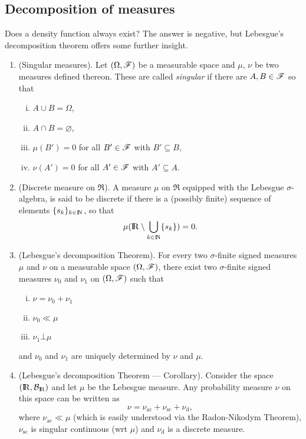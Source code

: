 \documentclass[a4paper,10pt]{article}
\begin{document}
\subsection{Decomposition of measures}
Does a density function always exist? The answer is negative, but Lebesgue's decomposition 
theorem offers some further insight. 
\begin{enumerate}
 \item (Singular measures). Let $(\Omega, \mathscr{F})$ be a measurable space and $\mu$, $\nu$
       be two measures defined thereon. These are called \textit{singular} if there are 
       $A,B\in\mathscr{F}$ so that
       \begin{enumerate}[(i)]
        \item $A\cup B=\Omega$, 
        \item $A\cap B=\varnothing$,
        \item $\mu(B')=0$ for all $B'\in\mathscr{F}$ with $B'\subseteq B$,
        \item $\nu(A')=0$ for all $A'\in\mathscr{F}$ with $A'\subseteq A$.
       \end{enumerate}
 \item (Discrete measure on $\Re$). A measure $\mu$ on $\Re$ equipped with the Lebesgue $\sigma$-algebra,
       is said to be discrete if there is a (possibly finite) sequence of elements $\{s_k\}_{k\in\N}$,
       so that 
       \[
        \mu(\Re\setminus \bigcup_{k\in\N} \{s_k\}) = 0.
       \]
 \item (Lebesgue's decomposition Theorem). For every two $\sigma$-finite signed measures $\mu$ and $\nu$
       on a measurable space $(\Omega, \mathscr{F})$, there exist two $\sigma$-finite signed measures $\nu_0$ and $\nu_1$ 
       on $(\Omega, \mathscr{F})$ such that
       \begin{enumerate}[(i)]
        \item $\nu = \nu_0 + \nu_1$
        \item $\nu_0\ll \mu$
        \item $\nu_1 {}\bot{} \mu$
       \end{enumerate}
       and $\nu_0$ and $\nu_1$ are uniquely determined by $\nu$ and $\mu$.
\item (Lebesgue's decomposition Theorem --- Corollary).
      Consider the space $(\Re,\B_\Re)$ and let $\mu$ be the Lebesgue measure. Any probability measure $\nu$
      on this space can be written as
      \[
       \nu = \nu_{\text{ac}} + \nu_{\text{sc}} + \nu_{\text{d}},
      \]
      where $\nu_{\text{ac}} \ll \mu$ (which is easily understood via the 
      Radon-Nikodym Theorem), $\nu_{\text{sc}}$ is singular continuous (wrt $\mu$) and $\nu_{\text{d}}$
      is a discrete measure.
             
\end{enumerate}
\end{document}
